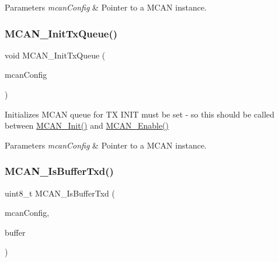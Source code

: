\begin{DoxyParams}{Parameters}
{\em mcan\+Config} & Pointer to a M\+C\+AN instance. \\
\hline
\end{DoxyParams}
\mbox{\label{group__can__module_gaf7258e6de240c101aa46f33a26c87615}} 
\subsubsection{\texorpdfstring{MCAN\_InitTxQueue()}{MCAN\_InitTxQueue()}}
{\footnotesize\ttfamily void M\+C\+A\+N\+\_\+\+Init\+Tx\+Queue (\begin{DoxyParamCaption}\item[{const \mbox{\hyperlink{structMCan__ConfigTag}{M\+Can\+\_\+\+Config\+Type}} $\ast$}]{mcan\+Config }\end{DoxyParamCaption})}



Initializes M\+C\+AN queue for TX I\+N\+IT must be set -\/ so this should be called between \mbox{\hyperlink{group__can__module_ga9b35cd79fb5eeec8cf1ba7247b25a646}{M\+C\+A\+N\+\_\+\+Init()}} and \mbox{\hyperlink{group__can__module_ga712fa4d48e3fd1365a08a91cd3932104}{M\+C\+A\+N\+\_\+\+Enable()}} 


\begin{DoxyParams}{Parameters}
{\em mcan\+Config} & Pointer to a M\+C\+AN instance. \\
\hline
\end{DoxyParams}
\mbox{\label{group__can__module_gaee6e3a1e95ef603e33da5421167ad776}} 
\subsubsection{\texorpdfstring{MCAN\_IsBufferTxd()}{MCAN\_IsBufferTxd()}}
{\footnotesize\ttfamily uint8\+\_\+t M\+C\+A\+N\+\_\+\+Is\+Buffer\+Txd (\begin{DoxyParamCaption}\item[{const \mbox{\hyperlink{structMCan__ConfigTag}{M\+Can\+\_\+\+Config\+Type}} $\ast$}]{mcan\+Config,  }\item[{uint8\+\_\+t}]{buffer }\end{DoxyParamCaption})}



